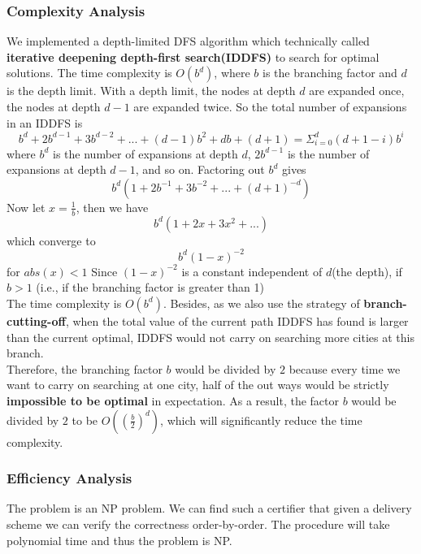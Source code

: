 \documentclass{llncs}
\begin{document}
\subsubsection{Complexity Analysis}
We implemented a depth-limited DFS algorithm which technically called \textbf{iterative deepening depth-first search(IDDFS)} to search for optimal solutions. 
The time complexity is $O(b^d)$, where $b$ is the branching factor and $d$ is the depth limit.
With a depth limit, the nodes at depth $d$ are expanded once, the nodes at depth $d-1$ are expanded twice. So the total number of expansions in an IDDFS is
$$b^d + 2b^{d-1} + 3b^{d-2} + ... + (d-1)b^2 + db + (d+1) = \Sigma_{i=0}^{d} (d + 1 - i)b^i$$
where $b^d$ is the number of expansions at depth $d$, $2b^{d-1}$ is the number of expansions at depth $d-1$, and so on. Factoring out $b^d$ gives
$$b^d(1 + 2b^{-1} + 3 b^{-2} + ... + (d + 1)^{-d})$$
Now let $x = \frac{1}{b}$, then we have 
$$b^d(1 + 2x + 3x^2 + ... )$$ which converge to 
$$b^d(1 - x)^{-2}$$ for $abs(x) < 1$
Since $(1-x)^{-2}$ is a constant independent of $d$(the depth), if $b > 1$ (i.e., if the branching factor is greater than 1)\\
The time complexity is $O(b^d)$.
Besides, as we also use the strategy of \textbf{branch-cutting-off}, when the total value of the current path IDDFS has found is larger than the current optimal, IDDFS would not carry on searching more cities at this branch.\\
Therefore, the branching factor $b$ would be divided by $2$ because every time we want to carry on searching at one city, half of the out ways would be strictly \textbf{impossible to be optimal} in expectation. As a result, the factor $b$ would be divided by $2$ to be $O((\frac{b}{2})^d)$, which will significantly reduce  the time complexity. 
\subsubsection{Efficiency Analysis}
The problem is an NP problem. We can find such a certifier that given a delivery scheme we can verify the correctness order-by-order. The procedure will take polynomial time and thus the problem is NP.
\end{document}
